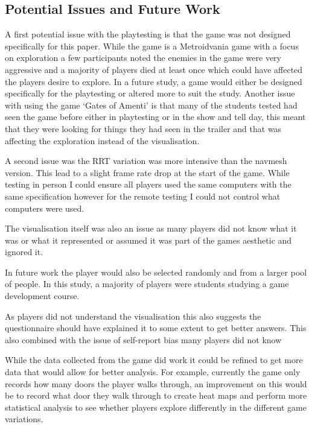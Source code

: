 \documentclass[journal]{IEEEtran}
\begin{document}
	\subsection{Potential Issues and Future Work}
	
	A first potential issue with the playtesting is that the game was not designed specifically for this paper. While the game is a Metroidvania game with a focus on exploration a few participants noted the enemies in the game were very aggressive and a majority of players died at least once which could have affected the players desire to explore. In a future study, a game would either be designed specifically for the playtesting or altered more to suit the study.  Another issue with using the game `Gates of Amenti' is that many of the students tested had seen the game before either in playtesting or in the show and tell day, this meant that they were looking for things they had seen in the trailer and that was affecting the exploration instead of the visualisation.
	
	A second issue was the RRT variation was more intensive than the navmesh version. This lead to a slight frame rate drop at the start of the game. While testing in person I could ensure all players used the same computers with the same specification however for the remote testing I could not control what computers were used. 
	
	The visualisation itself was also an issue as many players did not know what it was or what it represented or assumed it was part of the games aesthetic and ignored it.
	
	In future work the player would also be selected randomly and from a larger pool of people. In this study, a majority of players were students studying a game development course.
	
	
	As players did not understand the visualisation this also suggests the questionnaire should have explained it to some extent to get better answers. This also combined with the issue of self-report bias many players did not know  
	
	While the data collected from the game did work it could be refined to get more data that would allow for better analysis. For example, currently the game only records how many doors the player walks through, an improvement on this would be to record what door they walk through to create heat maps and perform more statistical analysis to see whether players explore differently in the different game variations.
	
\end{document}
